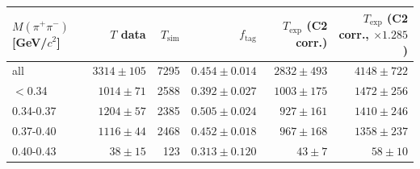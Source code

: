 \begin{tabular}{@{}l r r r r r@{}}
\toprule
$M(\pi^+\pi^-)$ [GeV/$c^2$] & $T$ data & $T_{\mathrm{sim}}$ & $f_{\mathrm{tag}}$ & $T_{\mathrm{exp}}$ (C2 corr.) & $T_{\mathrm{exp}}$ (C2 corr., $\times1.285$) \\
\midrule
all & $3314\pm105$ & 7295 & $0.454\pm0.014$ & $2832\pm493$ & $4148\pm722$ \\
$<$0.34 & $1014\pm71$ & 2588 & $0.392\pm0.027$ & $1003\pm175$ & $1472\pm256$ \\
0.34-0.37 & $1204\pm57$ & 2385 & $0.505\pm0.024$ & $927\pm161$ & $1410\pm246$ \\
0.37-0.40 & $1116\pm44$ & 2468 & $0.452\pm0.018$ & $967\pm168$ & $1358\pm237$ \\
0.40-0.43 & $38\pm15$ & 123 & $0.313\pm0.120$ & $43\pm7$ & $58\pm10$ \\
\bottomrule
\end{tabular}
